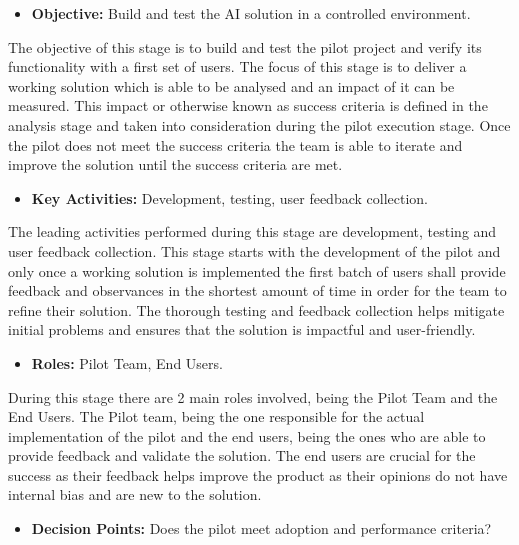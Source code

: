 \documentclass[]{imc-inf}
\def\tightlist{}
\begin{document}
\begin{itemize}
	\tightlist
	\item
	\textbf{Objective:} Build and test the AI solution in a controlled
	environment.
\end{itemize}

The objective of this stage is to build and test the pilot project and
verify its functionality with a first set of users. The focus of this
stage is to deliver a working solution which is able to be analysed and
an impact of it can be measured. This impact or otherwise known as
success criteria is defined in the analysis stage and taken into
consideration during the pilot execution stage. Once the pilot does not
meet the success criteria the team is able to iterate and improve the
solution until the success criteria are met.

\begin{itemize}
	\tightlist
	\item
	\textbf{Key Activities:} Development, testing, user feedback
	collection.
\end{itemize}

The leading activities performed during this stage are development,
testing and user feedback collection. This stage starts with the
development of the pilot and only once a working solution is implemented
the first batch of users shall provide feedback and observances in the
shortest amount of time in order for the team to refine their solution.
The thorough testing and feedback collection helps mitigate initial
problems and ensures that the solution is impactful and user-friendly.

\begin{itemize}
	\tightlist
	\item
	\textbf{Roles:} Pilot Team, End Users.
\end{itemize}

During this stage there are 2 main roles involved, being the Pilot Team
and the End Users. The Pilot team, being the one responsible for the
actual implementation of the pilot and the end users, being the ones who
are able to provide feedback and validate the solution. The end users
are crucial for the success as their feedback helps improve the product
as their opinions do not have internal bias and are new to the solution.

\begin{itemize}
	\tightlist
	\item
	\textbf{Decision Points:} Does the pilot meet adoption and performance
	criteria?
\end{itemize}
\end{document}
